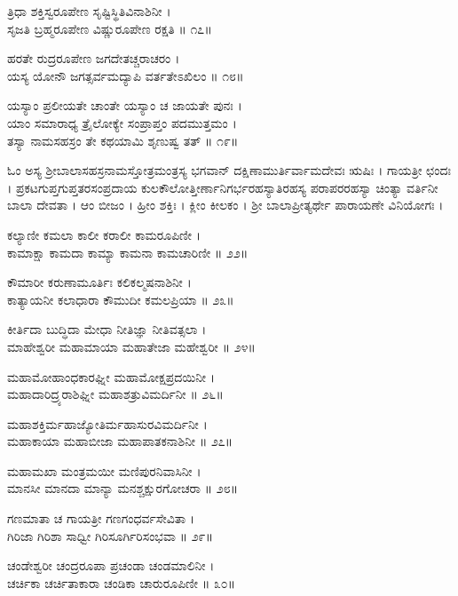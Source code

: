 ತ್ರಿಧಾ ಶಕ್ತಿಸ್ವರೂಪೇಣ ಸೃಷ್ಟಿಸ್ಥಿತಿವಿನಾಶಿನೀ ।\\
ಸೃಜತಿ ಬ್ರಹ್ಮರೂಪೇಣ ವಿಷ್ಣುರೂಪೇಣ ರಕ್ಷತಿ ॥ ೧೭॥

ಹರತೇ ರುದ್ರರೂಪೇಣ ಜಗದೇತಚ್ಚರಾಚರಂ ।\\
ಯಸ್ಯ ಯೋನೌ ಜಗತ್ಸರ್ವಮದ್ಯಾಪಿ ವರ್ತತೇಽಖಿಲಂ ॥ ೧೮॥

ಯಸ್ಯಾಂ ಪ್ರಲೀಯತೇ ಚಾಂತೇ ಯಸ್ಯಾಂ ಚ ಜಾಯತೇ ಪುನಃ ।\\
ಯಾಂ ಸಮಾರಾಧ್ಯ ತ್ರೈಲೋಕ್ಯೇ ಸಂಪ್ರಾಪ್ತಂ ಪದಮುತ್ತಮಂ ।\\
ತಸ್ಯಾ ನಾಮಸಹಸ್ರಂ ತೇ ಕಥಯಾಮಿ ಶೃಣುಷ್ವ ತತ್ ॥ ೧೯॥

ಓಂ ಅಸ್ಯ ಶ್ರೀಬಾಲಾಸಹಸ್ರನಾಮಸ್ತೋತ್ರಮಂತ್ರಸ್ಯ ಭಗವಾನ್ ದಕ್ಷಿಣಾಮುರ್ತಿರ್ವಾಮದೇವಃ ಋಷಿಃ । ಗಾಯತ್ರೀ ಛಂದಃ । ಪ್ರಕಟಗುಪ್ತಗುಪ್ತತರಸಂಪ್ರದಾಯ ಕುಲಕೌಲೋತ್ತೀರ್ಣಾನಿಗರ್ಭರಹಸ್ಯಾತಿರಹಸ್ಯ ಪರಾಪರರಹಸ್ಯಾ ಚಿಂತ್ಯಾ ವರ್ತಿನೀ ಬಾಲಾ ದೇವತಾ । ಆಂ ಬೀಜಂ । ಹ್ರೀಂ ಶಕ್ತಿಃ । ಕ್ಲೀಂ ಕೀಲಕಂ । ಶ್ರೀ ಬಾಲಾಪ್ರೀತ್ಯರ್ಥೇ ಪಾರಾಯಣೇ ವಿನಿಯೋಗಃ ।\\


ಕಲ್ಯಾಣೀ ಕಮಲಾ ಕಾಲೀ ಕರಾಲೀ ಕಾಮರೂಪಿಣೀ ।\\
ಕಾಮಾಕ್ಷಾ ಕಾಮದಾ ಕಾಮ್ಯಾ ಕಾಮನಾ ಕಾಮಚಾರಿಣೀ ॥ ೨೨॥

ಕೌಮಾರೀ ಕರುಣಾಮೂರ್ತಿಃ ಕಲಿಕಲ್ಮಷನಾಶಿನೀ ।\\
ಕಾತ್ಯಾಯನೀ ಕಲಾಧಾರಾ ಕೌಮುದೀ ಕಮಲಪ್ರಿಯಾ ॥ ೨೩॥

ಕೀರ್ತಿದಾ ಬುದ್ಧಿದಾ ಮೇಧಾ ನೀತಿಜ್ಞಾ ನೀತಿವತ್ಸಲಾ ।\\
ಮಾಹೇಶ್ವರೀ ಮಹಾಮಾಯಾ ಮಹಾತೇಜಾ ಮಹೇಶ್ವರೀ ॥ ೨೪॥

ಮಹಾಮೋಹಾಂಧಕಾರಘ್ನೀ ಮಹಾಮೋಕ್ಷಪ್ರದಯಿನೀ ।\\
ಮಹಾದಾರಿದ್ರ್ಯರಾಶಿಘ್ನೀ ಮಹಾಶತ್ರುವಿಮರ್ದಿನೀ ॥ ೨೬॥

ಮಹಾಶಕ್ತಿರ್ಮಹಾಜ್ಯೋತಿರ್ಮಹಾಸುರವಿಮರ್ದಿನೀ ।\\
ಮಹಾಕಾಯಾ ಮಹಾಬೀಜಾ ಮಹಾಪಾತಕನಾಶಿನೀ ॥ ೨೭॥

ಮಹಾಮಖಾ ಮಂತ್ರಮಯೀ ಮಣಿಪುರನಿವಾಸಿನೀ ।\\
ಮಾನಸೀ ಮಾನದಾ ಮಾನ್ಯಾ ಮನಶ್ಚಕ್ಷುರಗೋಚರಾ ॥ ೨೮॥

ಗಣಮಾತಾ ಚ ಗಾಯತ್ರೀ ಗಣಗಂಧರ್ವಸೇವಿತಾ ।\\
ಗಿರಿಜಾ ಗಿರಿಶಾ ಸಾಧ್ವೀ ಗಿರಿಸೂರ್ಗಿರಿಸಂಭವಾ ॥ ೨೯॥

ಚಂಡೇಶ್ವರೀ ಚಂದ್ರರೂಪಾ ಪ್ರಚಂಡಾ ಚಂಡಮಾಲಿನೀ ।\\
ಚರ್ಚಿಕಾ ಚರ್ಚಿತಾಕಾರಾ ಚಂಡಿಕಾ ಚಾರುರೂಪಿಣೀ ॥ ೩೦॥

